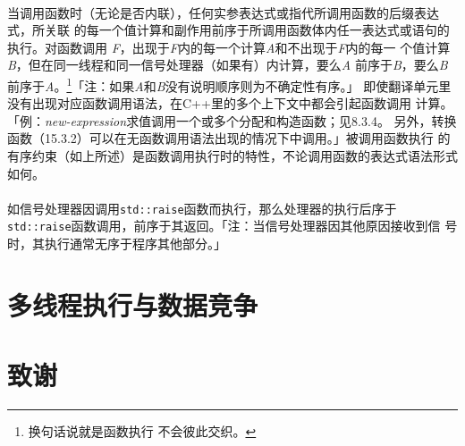 \paragraph{}
当调用函数时（无论是否内联），任何实参表达式或指代所调用函数的后缀表达式，所关联
的每一个值计算和副作用前序于所调用函数体内任一表达式或语句的执行。对函数调用
\textit{F}，出现于\textit{F}内的每一个计算\textit{A}和不出现于\textit{F}内的每一
个值计算\textit{B}，但在同一线程和同一信号处理器（如果有）内计算，要么\textit{A}
前序于\textit{B}，要么\textit{B}前序于\textit{A}。\footnote{换句话说就是函数执行
不会彼此交织。}「注：如果\textit{A}和\textit{B}没有说明顺序则为不确定性有序。」
即使翻译单元里没有出现对应函数调用语法，在C++里的多个上下文中都会引起函数调用
计算。「例：\textit{new-expression}求值调用一个或多个分配和构造函数；见8.3.4。
另外，转换函数（15.3.2）可以在无函数调用语法出现的情况下中调用。」被调用函数执行
的有序约束（如上所述）是函数调用执行时的特性，不论调用函数的表达式语法形式如何。

\paragraph{}
如信号处理器因调用\texttt{std::raise}函数而执行，那么处理器的执行后序于
\texttt{std::raise}函数调用，前序于其返回。「注：当信号处理器因其他原因接收到信
号时，其执行通常无序于程序其他部分。」

\section{多线程执行与数据竞争}
\section{致谢}
